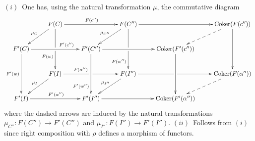 \documentclass[12pt]{article}
\def\coker{{\rm Coker}}
\begin{document}
\proof $(i)$~One has, using the natural transformation $\mu$, the commutative diagram
\begin{equation*}
\xymatrix{%
&F(C)\ar@{->}[rr]^{F(c'')}\ar@{->}[dl]_{\mu_C}\ar@{->}[dd]_(.65){F(w)}|!{[d];[d]}\hole&& F(C'') %
\ar@{->}[rr]\ar@{->}[dl]_{\mu_{C''}} \ar@{->}[dd]_(.75){F(w'')}|!{[d];[d]}\hole &&
\coker(F(c''))\ar@{-->}[dl]\ar@{->}[dd]
\\
F'(C)\ar@{->}[rr]^(.65){F'(c'')}\ar@{->}[dd]_{F'(w)}&&F'(C'')\ar@{->}[rr]\ar@{->}[dd]_(.75){F'(w'')}&&\coker(F'(c''))
\ar@{->}[dd]\\
%
&F(I)\ar@{->}[rr]^(.35){F(\alpha'')}|!{[r];[r]}\hole\ar@{->}[dl]_{\mu_I} %
&&F(I'')\ar@{->}[rr]|!{[r];[r]}\hole
\ar@{->}[dl]_{\mu_{I''}}
&&\coker(F(\alpha''))\ar@{-->}[dl]_{}\\
%
F'(I)\ar@{->}^{F'(\alpha'')}[rr]&&F'(I'')
\ar@{->}[rr]&&\coker(F'(\alpha''))\\
}
\end{equation*}
where the dashed arrows are induced by the natural transformations $\mu_{C''}:F(C'')\to F'(C'')$ and $\mu_{I''}:F(I'')\to F'(I'')$.\newline
$(ii)$~Follows from $(i)$ since right composition with $\rho$ defines a morphism of functors.\endproof 
\end{document}
